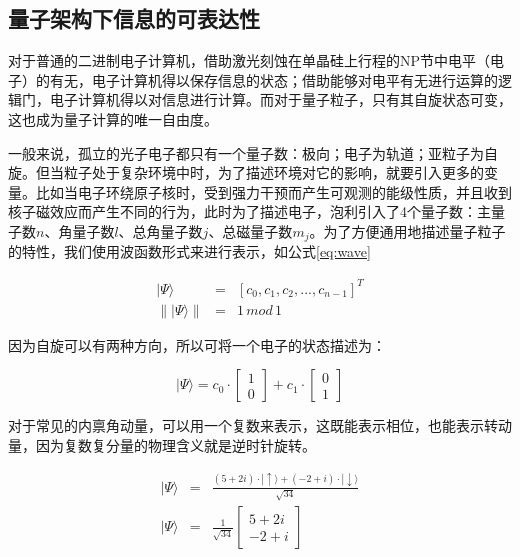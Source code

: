 \documentclass[UTF8, 11pt, a4paper]{ctexart}
\begin{document}
\subsection{量子架构下信息的可表达性}

对于普通的二进制电子计算机，借助激光刻蚀在单晶硅上行程的NP节中电平（电子）的有无，电子计算机得以保存信息的状态；借助能够对电平有无进行运算的逻辑门，电子计算机得以对信息进行计算。而对于量子粒子，只有其自旋状态可变，这也成为量子计算的唯一自由度\cite{shortq}。

一般来说，孤立的光子电子都只有一个量子数：极向；电子为轨道；亚粒子为自旋。但当粒子处于复杂环境中时，为了描述环境对它的影响，就要引入更多的变量。比如当电子环绕原子核时，受到强力干预而产生可观测的能级性质，并且收到核子磁效应而产生不同的行为，此时为了描述电子，泡利引入了4个量子数：主量子数$n$、角量子数$l$、总角量子数$j$、总磁量子数$m_{j}$\cite{shortq}。为了方便通用地描述量子粒子的特性，我们使用波函数形式来进行表示\cite{introq}，如公式\ref{eq:wave}

\begin{eqnarray}
\label{eq:wave}
| \Psi \rangle & = & [c_{0},c_{1},c_{2},...,c_{n-1}]^{T} \\
\label{eq:eigenstate}
\| | \Psi \rangle \|&=&1\hspace{2pt}mod \hspace{2pt} 1
\end{eqnarray}

因为自旋可以有两种方向，所以可将一个电子的状态描述为：

\begin{equation}
| \Psi \rangle = c_{0} \cdot \left[\begin{array}{c}1 \\0\end{array}\right] + c_{1} \cdot \left[\begin{array}{c}0 \\1\end{array}\right]
\end{equation}

对于常见的内禀角动量，可以用一个复数来表示，这既能表示相位，也能表示转动量，因为复数复分量的物理含义就是逆时针旋转。

\begin{eqnarray}
| \Psi \rangle &=& \frac{(5+2i) \cdot |\uparrow\rangle + (-2+i) \cdot |\downarrow\rangle}{\sqrt{34}} \\
| \Psi \rangle &=& \frac{1}{\sqrt{34}} \left[\begin{array}{c}5+2i \\ -2+i \end{array} \right] 
\end{eqnarray}
\end{document}
